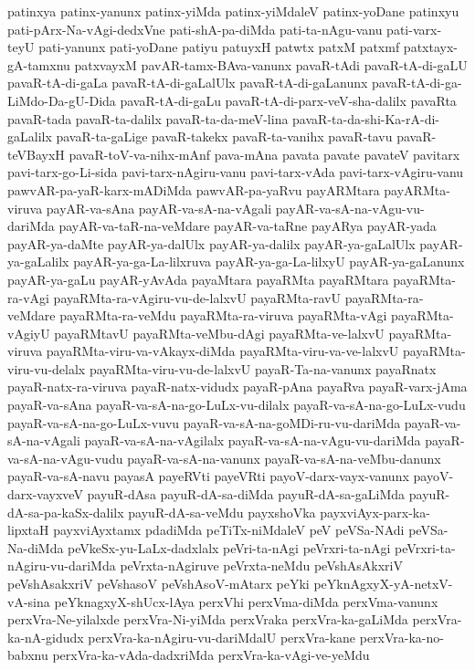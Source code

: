 {patinxya
patinx-yanunx
patinx-yiMda
patinx-yiMdaleV
patinx-yoDane
patinxyu
pati-pArx-Na-vAgi-dedxVne
pati-shA-pa-diMda
pati-ta-nAgu-vanu
pati-varx-teyU
pati-yanunx
pati-yoDane
patiyu
patuyxH
patwtx
patxM
patxmf
patxtayx-gA-tamxnu
patxvayxM
pavAR-tamx-BAva-vanunx
pavaR-tAdi
pavaR-tA-di-gaLU
pavaR-tA-di-gaLa
pavaR-tA-di-gaLalUlx
pavaR-tA-di-gaLanunx
pavaR-tA-di-ga-LiMdo-Da-gU-Dida
pavaR-tA-di-gaLu
pavaR-tA-di-parx-veV-sha-dalilx
pavaRta
pavaR-tada
pavaR-ta-dalilx
pavaR-ta-da-meV-lina
pavaR-ta-da-shi-Ka-rA-di-gaLalilx
pavaR-ta-gaLige
pavaR-takekx
pavaR-ta-vanihx
pavaR-tavu
pavaR-teVBayxH
pavaR-toV-va-nihx-mAnf
pava-mAna
pavata
pavate
pavateV
pavitarx
pavi-tarx-go-Li-sida
pavi-tarx-nAgiru-vanu
pavi-tarx-vAda
pavi-tarx-vAgiru-vanu
pawvAR-pa-yaR-karx-mADiMda
pawvAR-pa-yaRvu
payARMtara
payARMta-viruva
payAR-va-sAna
payAR-va-sA-na-vAgali
payAR-va-sA-na-vAgu-vu-dariMda
payAR-va-taR-na-veMdare
payAR-va-taRne
payARya
payAR-yada
payAR-ya-daMte
payAR-ya-dalUlx
payAR-ya-dalilx
payAR-ya-gaLalUlx
payAR-ya-gaLalilx
payAR-ya-ga-La-lilxruva
payAR-ya-ga-La-lilxyU
payAR-ya-gaLanunx
payAR-ya-gaLu
payAR-yAvAda
payaMtara
payaRMta
payaRMtara
payaRMta-ra-vAgi
payaRMta-ra-vAgiru-vu-de-lalxvU
payaRMta-ravU
payaRMta-ra-veMdare
payaRMta-ra-veMdu
payaRMta-ra-viruva
payaRMta-vAgi
payaRMta-vAgiyU
payaRMtavU
payaRMta-veMbu-dAgi
payaRMta-ve-lalxvU
payaRMta-viruva
payaRMta-viru-va-vAkayx-diMda
payaRMta-viru-va-ve-lalxvU
payaRMta-viru-vu-delalx
payaRMta-viru-vu-de-lalxvU
payaR-Ta-na-vanunx
payaRnatx
payaR-natx-ra-viruva
payaR-natx-vidudx
payaR-pAna
payaRva
payaR-varx-jAma
payaR-va-sAna
payaR-va-sA-na-go-LuLx-vu-dilalx
payaR-va-sA-na-go-LuLx-vudu
payaR-va-sA-na-go-LuLx-vuvu
payaR-va-sA-na-goMDi-ru-vu-dariMda
payaR-va-sA-na-vAgali
payaR-va-sA-na-vAgilalx
payaR-va-sA-na-vAgu-vu-dariMda
payaR-va-sA-na-vAgu-vudu
payaR-va-sA-na-vanunx
payaR-va-sA-na-veMbu-danunx
payaR-va-sA-navu
payasA
payeRVti
payeVRti
payoV-darx-vayx-vanunx
payoV-darx-vayxveV
payuR-dAsa
payuR-dA-sa-diMda
payuR-dA-sa-gaLiMda
payuR-dA-sa-pa-kaSx-dalilx
payuR-dA-sa-veMdu
payxshoVka
payxviAyx-parx-ka-lipxtaH
payxviAyxtamx
pdadiMda
peTiTx-niMdaleV
peV
peVSa-NAdi
peVSa-Na-diMda
peVkeSx-yu-LaLx-dadxlalx
peVri-ta-nAgi
peVrxri-ta-nAgi
peVrxri-ta-nAgiru-vu-dariMda
peVrxta-nAgiruve
peVrxta-neMdu
peVshAsAkxriV
peVshAsakxriV
peVshasoV
peVshAsoV-mAtarx
peYki
peYknAgxyX-yA-netxV-vA-sina
peYknagxyX-shUcx-lAya
perxVhi
perxVma-diMda
perxVma-vanunx
perxVra-Ne-yilalxde
perxVra-Ni-yiMda
perxVraka
perxVra-ka-gaLiMda
perxVra-ka-nA-gidudx
perxVra-ka-nAgiru-vu-dariMdalU
perxVra-kane
perxVra-ka-no-babxnu
perxVra-ka-vAda-dadxriMda
perxVra-ka-vAgi-ve-yeMdu
}
